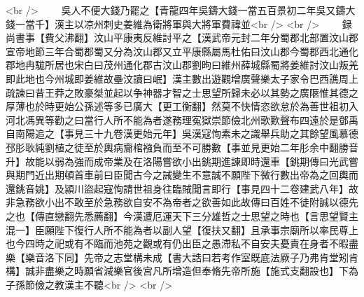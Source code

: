 <br />
　　吳人不便大錢乃罷之【青龍四年吳鑄大錢一當五百景初二年吳又鑄大錢一當千】漢主以凉州刺史姜維為衛將軍與大將軍費禕並<br />
<br />
　　録尚書事【費父沸翻】汶山平康夷反維討平之【漢武帝元封二年分蜀郡北部置汶山郡宣帝地節三年合蜀郡蜀又分為汶山郡又立平康縣屬馬杜佑曰汶山郡今蜀郡西北通化郡地冉駹所居也宋白曰茂州通化郡古汶山郡劉昫曰維州薛城縣蜀將姜維討汶山叛羌即此地也今州城即姜維故壘汶讀曰岷】漢主數出遊觀增廣聲樂太子家令巴西譙周上疏諫曰昔王莽之敗豪桀並起以争神器才智之士思望所歸未必以其勢之廣陿惟其德之厚薄也於時更始公孫述等多已廣大【更工衡翻】然莫不快情恣欲怠於為善世祖初入河北馮異等勸之曰當行人所不能為者遂務理寃獄崇節儉北州歌歎聲布四遠於是鄧禹自南陽追之【事見三十九卷漢更始元年】吳漢寇恂素未之識舉兵助之其餘望風慕德邳肜耿純劉植之徒至於輿病齎棺襁負而至不可勝數【事並見更始二年肜余中翻勝音升】故能以弱為強而成帝業及在洛陽嘗欲小出銚期進諫即時還車【銚期傳曰光武嘗與期門近出期頓首車前曰臣聞古今之誡變生不意誠不願陛下微行數出帝為之回輿而還銚音姚】及潁川盜起寇恂請世祖身往臨賊聞言即行【事見四十二卷建武八年】故非急務欲小出不敢至於急務欲自安不為帝者之欲善如此故傳曰百姓不徒附誠以德先之也【傳直戀翻先悉薦翻】今漢遭厄運天下三分雄哲之士思望之時也【言思望賢主混一】臣願陛下復行人所不能為者以副人望【復扶又翻】且承事宗廟所以率民尊上也今四時之祀或有不臨而池苑之觀或有仍出臣之愚滯私不自安夫憂責在身者不暇盡樂【樂音洛下同】先帝之志堂構未成【書大誥曰若考作室既底法厥子乃弗肯堂矧肯構】誠非盡樂之時願省減樂官後宫凡所增造但奉脩先帝所施【施式支翻設也】下為子孫節儉之教漢主不聽<br />
<br />
